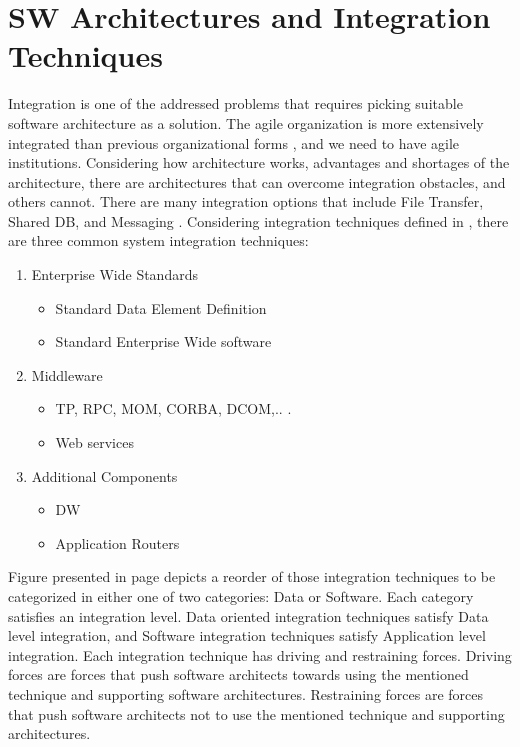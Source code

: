 \documentclass[12pt,a4paper,final,twoside,onecolumn,titlepage]{book}
\begin{document}
\section{SW Architectures and Integration Techniques}
Integration is one of the addressed problems that requires picking suitable software architecture as a solution. The agile organization is more extensively integrated than previous organizational forms \cite{M34}, and we need to have agile institutions. Considering how architecture works, advantages and shortages of the architecture, there are architectures that can overcome integration obstacles, and others cannot. There are many integration options that include File Transfer, Shared \gls{DB}, and Messaging \cite{M35}. Considering integration techniques defined in \cite{M36}, there are three common system integration techniques:

\begin{enumerate}
\item Enterprise Wide Standards
\begin{itemize}
\item Standard Data Element Definition
\item Standard Enterprise Wide software
\end{itemize}
\item Middleware
\begin{itemize}
\item TP, \gls{RPC}, MOM, \gls{CORBA}, DCOM,.. .
\item Web services
\end{itemize}
\item Additional Components
\begin{itemize}
\item \gls{DW}
\item Application Routers
\end{itemize}
\end{enumerate}

Figure \cite{M06} presented in page \pageref{M6} depicts a reorder of those integration techniques to be categorized in either one of two categories: Data or Software. Each category satisfies an integration level. Data oriented integration techniques satisfy Data level integration, and Software integration techniques satisfy Application level integration. Each integration technique has driving and restraining forces. Driving forces are forces that push software architects towards using the mentioned technique and supporting software architectures. Restraining forces are forces that push software architects not to use the mentioned technique and supporting architectures.
\end{document}
